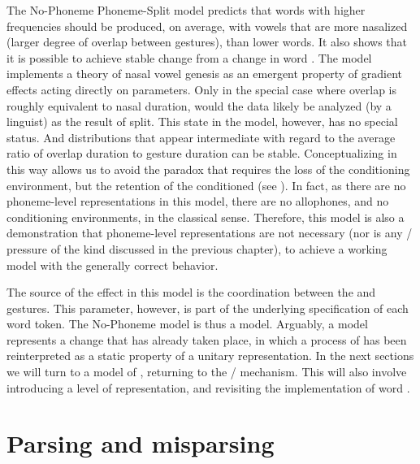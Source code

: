 The No-Phoneme Phoneme-Split model predicts that words with higher
frequencies should be produced, on average, with vowels that are more
nasalized (larger degree of overlap between gestures), than lower
 words. It also shows that it is possible to achieve stable
 change from a change in word . The model implements
a theory of nasal vowel genesis as an emergent property of gradient
effects acting directly on  parameters. Only in the special
case where overlap is roughly equivalent to nasal duration, would
the data likely be analyzed (by a linguist) as the result of 
split. This state in the model, however, has no special status. And
distributions that appear intermediate with regard to the average
ratio of overlap duration to  gesture duration can be stable.
Conceptualizing  in this way allows us to avoid the 
paradox that requires the loss of the conditioning environment, but
the retention of the conditioned  (see ).
In fact, as there are no phoneme-level representations in this model,
there are no allophones, and no conditioning environments, in the
classical sense. Therefore, this model is also a demonstration that
phoneme-level representations are not necessary (nor is any /
pressure of the kind discussed in the previous chapter), to achieve
a working model with the generally correct behavior. 

The source of the  effect in this model is the coordination
between the  and  gestures. This parameter, however,
is part of the underlying specification of each word token. The No-Phoneme
model is thus a  model. Arguably, a  model
represents a change that has already taken place, in which a process
of  has been reinterpreted as a static property of a unitary
representation. In the next sections we will turn to a 
model of , returning to the /
 mechanism. This will also involve introducing a 
level of representation, and revisiting the implementation of word
.

\section{Parsing and misparsing}

